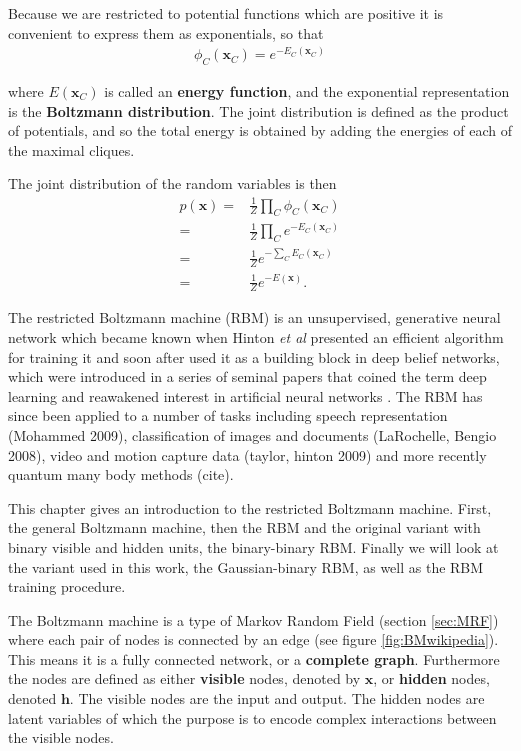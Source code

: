 
Because we are restricted to potential functions which are positive it is convenient to express them as exponentials, so that
\begin{align}
	\phi_C (\bm{x}_C) = e^{-E_C(\bm{x}_C)}
\end{align}

where $E(\bm{x}_C)$ is called an \textbf{energy function}, and the exponential representation is the \textbf{Boltzmann distribution}. The joint distribution is defined as the product of potentials, and so the total energy is obtained by adding the energies of each of the maximal cliques.

The joint distribution of the random variables is then
\begin{align}
	p(\bm{x}) =& \frac{1}{Z} \prod_C \phi_C (\bm{x}_C) \nonumber \\
	=& \frac{1}{Z} \prod_C e^{-E_C(\bm{x}_C)} \nonumber \\
	=& \frac{1}{Z} e^{-\sum_C E_C(\bm{x}_C)} \nonumber \\
	=& \frac{1}{Z} e^{-E(\bm{x})}.
\end{align} 



The restricted Boltzmann machine (RBM) is an unsupervised, generative
neural network which became known when Hinton \textit{et al} presented
an efficient algorithm for training it \cite{Hinton2002} and soon
after used it as a building block in deep belief networks, which were
introduced in a series of seminal papers that coined the term deep
learning and reawakened interest in artificial neural networks
\cite{Hinton2006a} \cite{Hinton2006} \cite{Hinton2007}. The RBM has
since been applied to a number of tasks including speech
representation (Mohammed 2009), classification of images and documents
(LaRochelle, Bengio 2008), video and motion capture data (taylor,
hinton 2009) and more recently quantum many body methods (cite).

This chapter gives an introduction to the restricted Boltzmann
machine. First, the general Boltzmann machine, then the RBM and the
original variant with binary visible and hidden units, the
binary-binary RBM. Finally we will look at the variant used in this
work, the Gaussian-binary RBM, as well as the RBM training procedure.








The Boltzmann machine \cite{Ackley1985} is a type of Markov Random
Field (section \ref{sec:MRF}) where each pair of nodes is connected by
an edge (see figure \ref{fig:BMwikipedia}). This means it is a fully
connected network, or a \textbf{complete graph}. Furthermore the nodes
are defined as either \textbf{visible} nodes, denoted by $\bm{x}$, or
\textbf{hidden} nodes, denoted $\bm{h}$. The visible nodes are the
input and output. The hidden nodes are latent variables of which the
purpose is to encode complex interactions between the visible nodes.

